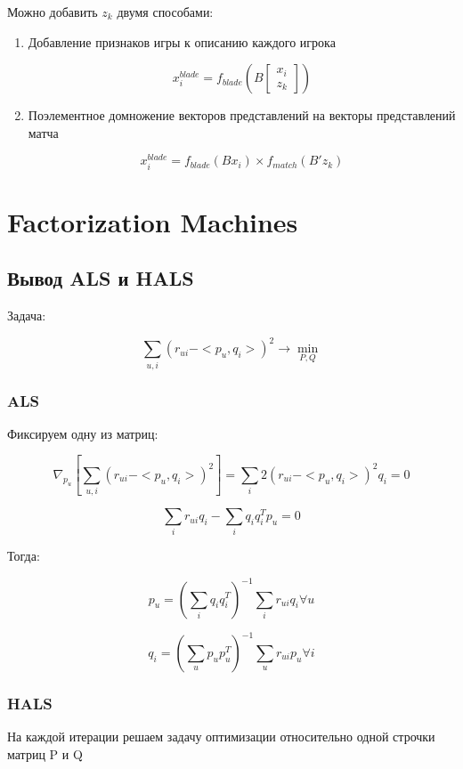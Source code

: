 \documentclass[a4paper, 12pt]{article}
\begin{document}
Можно добавить $z_k$ двумя способами:

\begin{enumerate}
    \item Добавление признаков игры к описанию каждого игрока
    
    \[x_i^{blade} = f_{blade}\left(B \begin{bmatrix}
        x_i \\
        z_k
    \end{bmatrix}\right)\]

    \item Поэлементное домножение векторов представлений 
    на векторы представлений матча

    \[x_i^{blade} = f_{blade}(Bx_i) \times f_{match}(B'z_k)\]
\end{enumerate}

\section{Factorization Machines}

\subsection{Вывод ALS и HALS}

Задача:

\[\sum_{u,i} (r_{ui} - <p_u, q_i>)^2 \to \min_{P, Q}\]

\subsubsection{ALS}

Фиксируем одну из матриц:

\[\nabla_{p_u} \left[\sum_{u,i} (r_{ui} - <p_u, q_i>)^2\right]
= \sum_i 2(r_{ui} - <p_u, q_i>)^2 q_i = 0\]

\[\sum_i r_{ui}q_i - \sum_i q_i q_i^T p_u = 0\]

Тогда:

\[p_u = \left(\sum_i q_i q_i^T \right)^{-1} \sum_i r_{ui}q_i \forall u\]

\[q_i = \left(\sum_u p_u p_u^T \right)^{-1} \sum_u r_{ui}p_u \forall i\]

\subsubsection{HALS}

На каждой итерации решаем задачу оптимизации 
относительно одной строчки матриц P и Q
\end{document}
